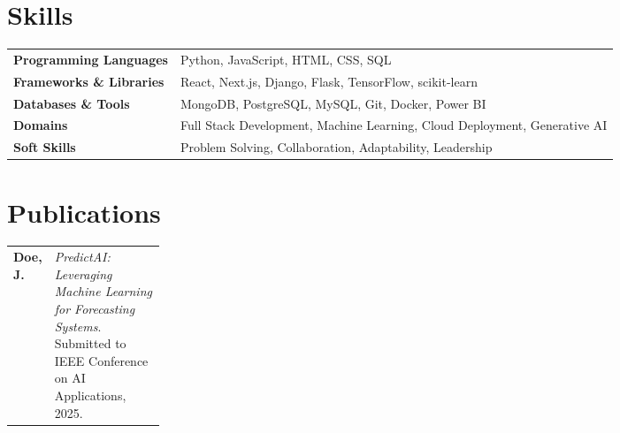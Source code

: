 \documentclass[a4paper,12pt]{article}
\begin{document}
\section{Skills}
\begin{tabularx}{\linewidth}{@{}l X@{}}
\textbf{Programming Languages} & Python, JavaScript, HTML, CSS, SQL \\
\textbf{Frameworks \& Libraries} & React, Next.js, Django, Flask, TensorFlow, scikit-learn \\
\textbf{Databases \& Tools} & MongoDB, PostgreSQL, MySQL, Git, Docker, Power BI \\
\textbf{Domains} & Full Stack Development, Machine Learning, Cloud Deployment, Generative AI \\
\textbf{Soft Skills} & Problem Solving, Collaboration, Adaptability, Leadership \\
\end{tabularx}

\section{Publications}
\noindent
\begin{tabularx}{\linewidth}{@{}>{\raggedright\arraybackslash}p{0.2\linewidth} X@{}}
\textbf{Doe, J.} & \textit{PredictAI: Leveraging Machine Learning for Forecasting Systems}. Submitted to IEEE Conference on AI Applications, 2025. \\
\end{tabularx}
\end{document}

